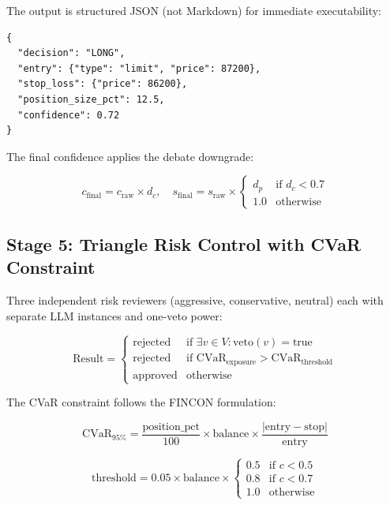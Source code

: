 \documentclass[twocolumn]{article}
\begin{document}
The output is structured JSON (not Markdown) for immediate executability:

\begin{verbatim}
{
  "decision": "LONG",
  "entry": {"type": "limit", "price": 87200},
  "stop_loss": {"price": 86200},
  "position_size_pct": 12.5,
  "confidence": 0.72
}
\end{verbatim}

The final confidence applies the debate downgrade:

\begin{equation}
c_{\text{final}} = c_{\text{raw}} \times d_c, \quad
s_{\text{final}} = s_{\text{raw}} \times
\begin{cases}
d_p & \text{if } d_c < 0.7 \\
1.0 & \text{otherwise}
\end{cases}
\end{equation}

\subsection{Stage 5: Triangle Risk Control with CVaR Constraint}

Three independent risk reviewers (aggressive, conservative, neutral) each with separate LLM instances and one-veto power:

\begin{equation}
\text{Result} =
\begin{cases}
\text{rejected} & \text{if } \exists v \in V: \text{veto}(v) = \text{true} \\
\text{rejected} & \text{if } \text{CVaR}_{\text{exposure}} > \text{CVaR}_{\text{threshold}} \\
\text{approved} & \text{otherwise}
\end{cases}
\end{equation}

The CVaR constraint follows the FINCON formulation\cite{fincon2024}:

\begin{equation}
\text{CVaR}_{95\%} = \frac{\text{position\_pct}}{100} \times \text{balance} \times \frac{|\text{entry} - \text{stop}|}{\text{entry}}
\end{equation}

\begin{equation}
\text{threshold} = 0.05 \times \text{balance} \times
\begin{cases}
0.5 & \text{if } c < 0.5 \\
0.8 & \text{if } c < 0.7 \\
1.0 & \text{otherwise}
\end{cases}
\end{equation}
\end{document}
